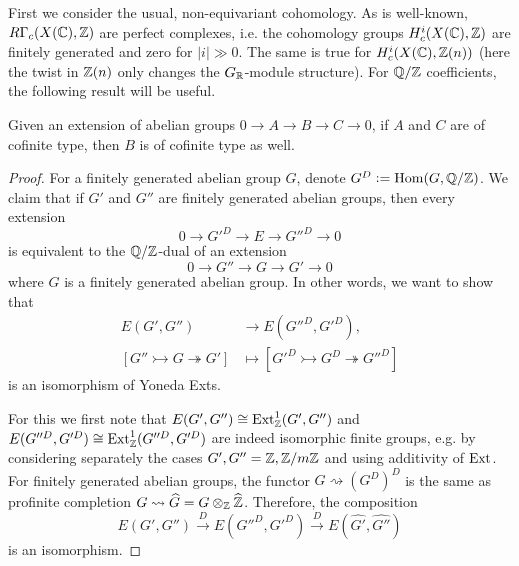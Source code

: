 \documentclass{article}
\numberwithin{equation}{section}
\begin{document}
First we consider the usual, non-equivariant cohomology. As is well-known,
$R\Gamma_c (X (\mathbb{C}), \mathbb{Z})$ are perfect complexes, i.e. the cohomology groups
$H^i_c (X (\mathbb{C}), \mathbb{Z})$ are finitely generated and zero for $|i| \gg 0$.  The
same is true for $H^i_c (X (\mathbb{C}), \mathbb{Z} (n))$ (here the twist in $\mathbb{Z} (n)$ only
changes the $G_{\mathbb{R}}$-module structure). For $\mathbb{Q}/\mathbb{Z}$ coefficients, the following
result will be useful.

\begin{lemma}
  \label{lemma:extensions-of-cofinite-type-groups}
  Given an extension of abelian groups
  $0 \to A \to B \to C \to 0$,
  if $A$ and $C$ are of cofinite type, then $B$ is of cofinite type as well.

  \begin{proof}
    For a finitely generated abelian group $G$, denote
    $G^D \mathrel{\mathop:}= \operatorname{Hom} (G, \mathbb{Q}/\mathbb{Z})$.  We claim that if $G'$ and $G''$ are finitely
    generated abelian groups, then every extension
    $$0 \to G'^D \to E \to G''^D \to 0$$
    is equivalent to the $\mathbb{Q}/\mathbb{Z}$-dual of an extension
    $$0 \to G'' \to G \to G' \to 0$$
    where $G$ is a finitely generated abelian group. In other words,
    we want to show that
    \begin{align*}
      E (G',G'') & \to E (G''^D,G'^D),\\
      [G'' \rightarrowtail G \twoheadrightarrow G'] & \mapsto
      [G'^D \rightarrowtail G^D \twoheadrightarrow G''^D]
    \end{align*}
    is an isomorphism of Yoneda Exts.

    For this we first note that $E (G',G'') \cong \operatorname{Ext}_{\mathbb{Z}}^1 (G',G'')$ and
    $E (G''^D, G'^D) \cong \operatorname{Ext}_{\mathbb{Z}}^1 (G''^D, G'^D)$ are indeed isomorphic
    finite groups, e.g. by considering separately the cases
    $G', G'' = \mathbb{Z}, \mathbb{Z}/m\mathbb{Z}$ and using additivity of $\operatorname{Ext}$. For finitely
    generated abelian groups, the functor $G \rightsquigarrow (G^D)^D$ is the
    same as profinite completion
    $G \rightsquigarrow \widehat{G} = G\otimes_{\mathbb{Z}} \widehat{\mathbb{Z}}$. Therefore,
    the composition
    \[ E (G',G'') \xrightarrow{D}
    E (G''^D,G'^D) \xrightarrow{D}
    E (\widehat{G'},\widehat{G''}) \]
    is an isomorphism.
  \end{proof}
\end{lemma}
\end{document}
